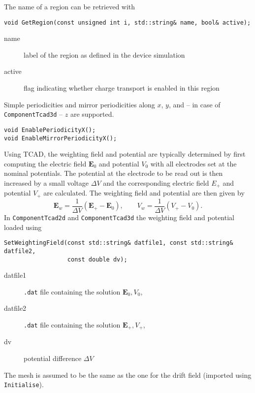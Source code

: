 The name of a region can be retrieved with
\begin{lstlisting}
void GetRegion(const unsigned int i, std::string& name, bool& active);
\end{lstlisting}
\begin{description}
  \item[name] 
  label of the region as defined in the device simulation
  \item[active] 
  flag indicating whether charge transport is enabled 
  in this region
\end{description}

Simple periodicities and mirror periodicities along 
\(x\), \(y\), and -- in case of \texttt{ComponentTcad3d} -- \(z\) 
are supported. 
\begin{lstlisting}
void EnablePeriodicityX();
void EnableMirrorPeriodicityX();
\end{lstlisting}

Using TCAD, the weighting field and potential are typically determined 
by first computing the electric field $\mathbf{E}_{0}$ and potential 
$V_{0}$ with all electrodes set at the nominal potentials.
The potential at the electrode to be read out is then increased by a 
small voltage $\Delta V$ and the corresponding electric field $E_{+}$ and 
potential $V_{+}$ are calculated. The weighting field and potential 
are then given by 
\begin{equation*}
  \mathbf{E}_{w} = \frac{1}{\Delta V}\left(\mathbf{E}_{+} - \mathbf{E}_{0}\right), \qquad V_{w} = \frac{1}{\Delta V}\left(V_{+} - V_{0}\right).
\end{equation*}
In \texttt{ComponentTcad2d} and \texttt{ComponentTcad3d} the weighting 
field and potential loaded using
\begin{lstlisting} 
SetWeightingField(const std::string& datfile1, const std::string& datfile2,
                  const double dv); 
\end{lstlisting}
\begin{description}
  \item[datfile1] \texttt{.dat} file containing the solution $\mathbf{E}_0, V_0$,
  \item[datfile2] \texttt{.dat} file containing the solution $\mathbf{E}_+, V_+$,
  \item[dv] potential difference $\Delta V$
\end{description}
The mesh is assumed to be the same as the one for the drift field 
(imported using \texttt{Initialise}).

